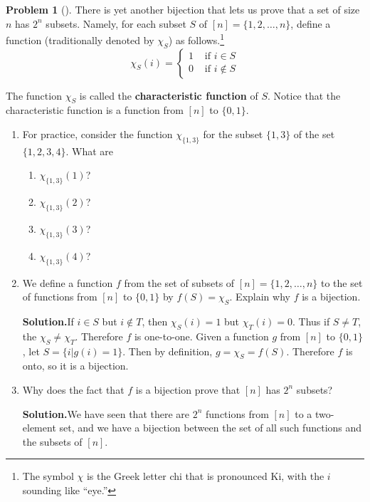 \documentclass[10pt,]{book}
\newcommand{\terminology}[1]{\textbf{#1}}
\theoremstyle{plain}
\theoremstyle{definition}
\newtheorem{activity}[project]{Problem}
\theoremstyle{definition}
\numberwithin{equation}{chapter}
\newcommand{\amp}{&}
\begin{document}
\begin{activity}[]\label{charfunction}
There is yet another bijection that lets us prove that a set of size \(n\) has \(2^n\) subsets. Namely, for each subset \(S\) of \([n]=\{1,2,\ldots, n\}\), define a function (traditionally denoted by \(\chi_S\)) as follows.\footnote{The symbol \(\chi\) is the Greek letter chi that is pronounced Ki, with the \(i\) sounding like ``eye.''\label{fn-1}}%
\begin{equation*}
\chi_S(i) = \begin{cases}1 \amp \mbox{ if }  i\in S \\ 0 \amp \mbox{ if }  i\not\in
S
\end{cases}
\end{equation*}
%
\par
The function \(\chi_S\) is called the \terminology{characteristic function} of \(S\). Notice that the characteristic function is a function from \([n]\) to \(\{0,1\}\).%
\begin{enumerate}[font=\bfseries,label=(\alph*),ref=\alph*]
\item\label{task-28} For practice, consider the function \(\chi_{\{1,3\}}\) for the subset \(\{1,3\}\) of the set \(\{1,2,3,4\}\).  What are \leavevmode%
\begin{enumerate}[label=(\roman*)]
\item\hypertarget{li-5}{}\(\chi_{\{1,3\}}(1)\)?%
\item\hypertarget{li-6}{}\(\chi_{\{1,3\}}(2)\)?%
\item\hypertarget{li-7}{}\(\chi_{\{1,3\}}(3)\)?%
\item\hypertarget{li-8}{}\(\chi_{\{1,3\}}(4)\)?%
\end{enumerate}
%
\item\label{task-29} We define a function \(f\) from the set of subsets of \([n]=\{1,2,\ldots, n\}\) to the set of functions from \([n]\) to \(\{0,1\}\) by \(f(S)=\chi_S\).  Explain why \(f\) is a bijection.%
\par\medskip\noindent%
\textbf{Solution.}\quad If \(i\in S\) but \(i\not\in T\), then \(\chi_S(i)=1\) but \(\chi_T(i)=0\). Thus if \(S\not= T\), the \(\chi_S\not=\chi_T\). Therefore \(f\) is one-to-one. Given a function \(g\) from \([n]\) to \(\{0,1\}\), let \(S=\{i|g(i)=1\}\). Then by definition, \(g=\chi_S=f(S)\). Therefore \(f\) is onto, so it is a bijection.%
\item\label{task-30} Why does the fact that \(f\) is a bijection prove that \([n]\) has \(2^n\) subsets?%
\par\medskip\noindent%
\textbf{Solution.}\quad We have seen that there are \(2^n\) functions from \([n]\) to a two-element set, and we have a bijection between the set of all such functions and the subsets of \([n]\).%
\end{enumerate}
\end{activity}
\end{document}
